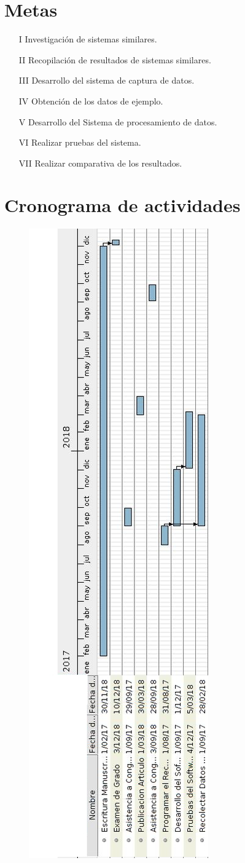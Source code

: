 \section*{Metas}
\begin{itemize}
  \item[I] Investigación de sistemas similares.
  \item[II] Recopilación de resultados de sistemas similares.
  \item[III] Desarrollo del sistema  de captura de datos.
  \item[IV] Obtención de los datos de ejemplo.
  \item[V] Desarrollo del Sistema de procesamiento de datos.
  \item[VI] Realizar pruebas del sistema.
  \item[VII] Realizar comparativa de los resultados.
\end{itemize}





\section{Cronograma de actividades}

\begin{figure}[h]
\centering
\includegraphics[width=0.3\columnwidth]{./CapituloI/Imagenes/Cronograma.jpg}
\end{figure}


